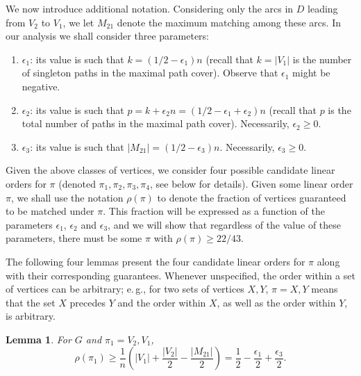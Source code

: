 \documentclass[11pt]{article}
\numberwithin{equation}{section}
\newtheorem{lemma}[theorem]{Lemma}
\theoremstyle{definition}
\theoremstyle{plain}
\newcommand{\eg}{e.\,g.}
\theoremstyle{plain}
\begin{document}
%
%

%
%
%
%

We now introduce additional notation.
Considering only the arcs in $D$ leading from $V_2$ to $V_1$, we let $M_{21}$ denote the maximum matching among these arcs. In our analysis we shall consider three parameters:

\begin{enumerate}
	
	\item $\epsilon_1$: its value is such that $k = \left(1/2 - \epsilon_1\right)n$ (recall that $k = |V_1|$ is the number of singleton paths in the maximal path cover). Observe that $\epsilon_1$ might be negative.
	
	\item $\epsilon_2$: its value is such that $p = k + \epsilon_2 n =  \left(1/2 - \epsilon_1 + \epsilon_2 \right)n$ (recall that $p$ is the total number of paths in the maximal path cover). Necessarily, $\epsilon_2 \ge 0$.
	
	\item $\epsilon_3$: its value is such that $|M_{21}| = \left(1/2 - \epsilon_3\right)n$. Necessarily, $\epsilon_3 \ge 0$.
	
\end{enumerate}

Given the above classes of vertices, we consider four possible candidate linear orders for $\pi$ (denoted $\pi_1, \pi_2, \pi_3, \pi_4$, see below for details). Given some linear order $\pi$, we shall use the notation $\rho(\pi)$ to denote the fraction of vertices guaranteed to be matched under $\pi$. This fraction will be expressed as a function of the parameters $\epsilon_1$, $\epsilon_2$ and $\epsilon_3$, and we will show that regardless of the value of these parameters, there must be some $\pi$ with $\rho(\pi) \ge 22/43$.

The following four lemmas present the four candidate linear orders for $\pi$ along with their corresponding guarantees.
Whenever unspecified, the order within a set of vertices can be arbitrary; \eg, for two sets of vertices $X,Y$, $\pi = X,Y$ means that the set $X$ precedes $Y$ and the order within $X$, as well as the order within $Y$, is arbitrary.

\begin{lemma}
	\label{lem:smallM21}
	For $G$ and $\pi_1 = V_2,V_1$, $$\rho(\pi_1) \ge \frac{1}{n}\left(|V_1|+\frac{|V_2|}{2} - \frac{|M_{21}|}{2}\right) = \frac{1}{2} - \frac{\epsilon_1}{2} + \frac{\epsilon_3}{2}.$$%
\end{lemma}
\end{document}
